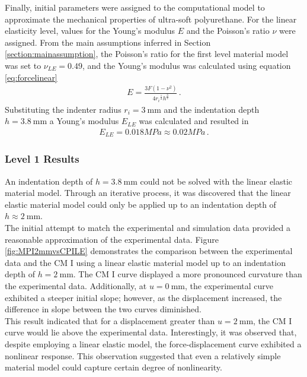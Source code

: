 Finally, initial parameters were assigned to the computational model to approximate the mechanical properties of ultra-soft polyurethane. 
For the linear elasticity level, values for the Young's modulus $E$ and the Poisson's ratio $\nu$ were assigned. 
From the main assumptions inferred in Section \ref{section:mainassumption}, the Poisson's ratio for the first 
level material model was set to $\nu_{LE} =  0.49$, and the Young's modulus was calculated using equation \ref{eq:forcelinear}
\begin{align}
    E = \frac{3F(1-\nu^2)} {4{r_i}^{\frac{1}{2}} {h}^{\frac{3}{2}}}\, .
    \label{eq:forcelinearcp1}
\end{align}
Substituting the indenter radius $r_i = \SI{3}{\milli \meter}$ and the indentation depth $h = \SI{3.8}{\milli \meter}$ a Young's modulus $E_{LE}$ was calculated and resulted in 
\begin{align}
    E_{LE} = 0.018 MPa \approx 0.02 MPa \, .
    \label{eq:Elinearcp1}
\end{align}


\subsubsection*{Level 1 Results}
\label{subsection:level1cmI}
An indentation depth of $h = \SI{3.8}{\milli \meter}$ could not be solved with the linear elastic material model. 
Through an iterative process, it was discovered that the linear elastic material model could only be applied 
up to an indentation depth of $h \approx \SI{2}{\milli \meter}$.\\

The initial attempt to match the experimental and simulation data provided a reasonable approximation of the experimental data.
Figure \ref{fig:MPI2mmvsCPILE} demonstrates the comparison between the experimental data and the CM I using a 
linear elastic material model up to an indentation depth of $h = \SI{2}{\milli \meter}$. The CM I curve displayed 
a more pronounced curvature than the experimental data. Additionally, at $u =\SI{0}{\milli \meter}$, 
the experimental curve exhibited a steeper initial slope; however, as the displacement increased, the 
difference in slope between the two curves diminished.\\

This result indicated that for a displacement greater than $u = \SI{2}{\milli \meter}$, the CM I curve would 
lie above the experimental data. Interestingly, it was observed that, despite employing a linear elastic model, 
the force-displacement curve exhibited a nonlinear response. This observation suggested that even a relatively 
simple material model could capture certain degree of nonlinearity. 

